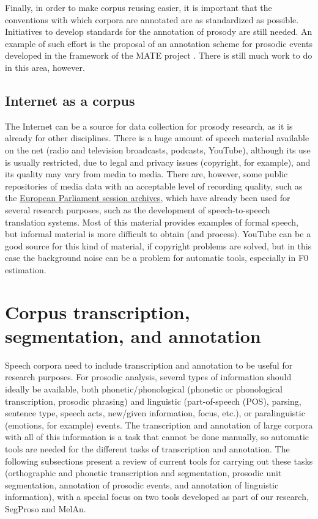 \documentclass[output=paper]{langsci/langscibook}
\begin{document}
Finally, in order to make corpus reusing easier, it is important that the conventions with which corpora are annotated are as standardized as possible. Initiatives to develop standards for the annotation of prosody are still needed. An example of such effort is the proposal of an annotation scheme for prosodic events developed in the framework of the MATE project \citep{Klein1998}. There is still much work to do in this area, however.

\subsection{Internet as a corpus}

The Internet can be a source for data collection for prosody research, as it is already for other disciplines. There is a huge amount of speech material available on the net (radio and television broadcasts, podcasts, YouTube), although its use is usually restricted, due to legal and privacy issues (copyright, for example), and its quality may vary from media to media. There are, however, some public repositories of media data with an acceptable level of recording quality, such as the \href{http://www.europarl.europa.eu/ep-live/en/plenary/search-by-date}{European Parliament session archives}, which have already been used for several research purposes, such as the development of speech-to-speech translation systems. Most of this material provides examples of formal speech, but informal material is more difficult to obtain (and process). YouTube can be a good source for this kind of material, if copyright problems are solved, but in this case the background noise can be a problem for automatic tools, especially in F0 estimation.

\section{Corpus transcription, segmentation, and annotation} 

Speech corpora need to include transcription and annotation to be useful for research purposes. For prosodic analysis, several types of information should ideally be available, both phonetic/phonological (phonetic or phonological transcription, prosodic phrasing) and linguistic (part-of-speech (POS), parsing, sentence type, speech acts, new/given information, focus, etc.), or paralinguistic (emotions, for example) events. The transcription and annotation of large corpora with all of this information is a task that cannot be done manually, so automatic tools are needed for the different tasks of transcription and annotation. The following subsections present a review of current tools for carrying out these tasks (orthographic and phonetic transcription and segmentation, prosodic unit segmentation, annotation of prosodic events, and annotation of linguistic information), with a special focus on two tools developed as part of our research, SegProso and MelAn.
\end{document}
